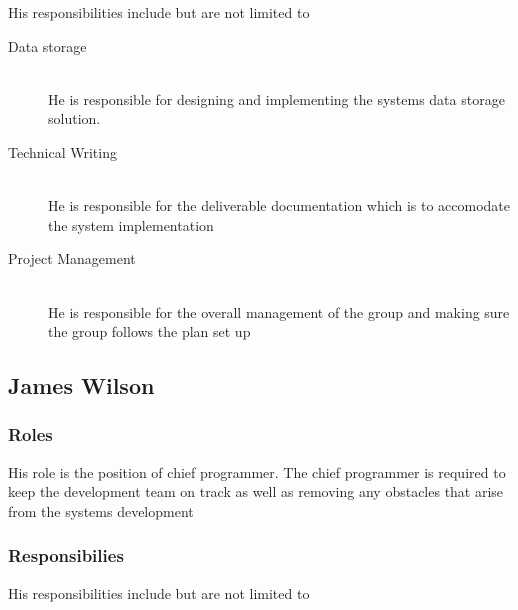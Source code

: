 \begin{itemize}
	His responsibilities include but are not limited to

	\begin{description}
		\item[Data storage] \hfill \\ He is responsible for designing and implementing the systems data storage solution.
		\item[Technical Writing] \hfill \\ He is responsible for the deliverable documentation which is to accomodate the system implementation
		\item[Project Management] \hfill \\ He is responsible for the overall management of the group and making sure the group follows the plan set up
	\end{description}


\subsection{James Wilson}


\subsubsection{Roles}

	His role is the position of chief programmer. The chief programmer is required to keep the development team on track as well as removing any obstacles that arise from the systems development


\subsubsection{Responsibilies}

	His responsibilities include but are not limited to


\end{itemize}
